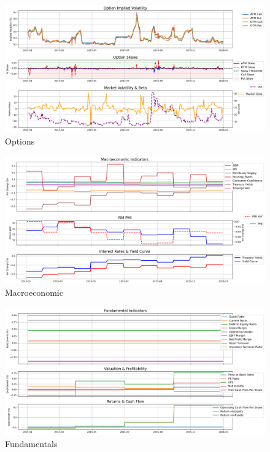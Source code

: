 \documentclass[8pt]{scrartcl}
\begin{document}
\begin{figure}[H]
    \centering
    \includegraphics[width=1\linewidth]{judge_reviews/META_M_gpt-4o-mini/2016-01-01/judge_Option_Implied_Volatility.png}
    \caption{Options}
\end{figure}

\begin{figure}[H]
    \centering
    \includegraphics[width=1\linewidth]{judge_reviews/META_M_gpt-4o-mini/2016-01-01/judge_Macroeconomic_Indicators.png}
    \caption{Macroeconomic}
\end{figure}

\begin{figure}[H]
    \centering
    \includegraphics[width=1\linewidth]{judge_reviews/META_M_gpt-4o-mini/2016-01-01/judge_Fundamental_Indicators.png}
    \caption{Fundamentals}
\end{figure}
\end{document}
